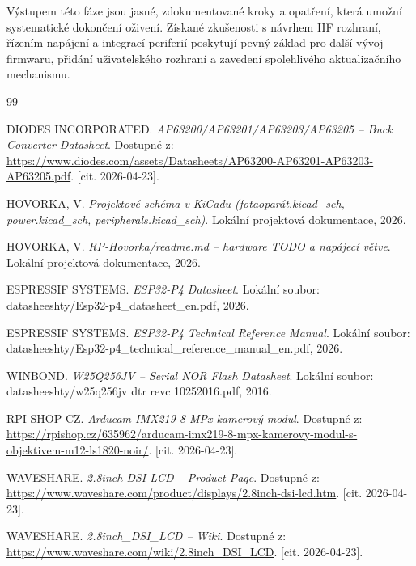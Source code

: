 \documentclass[12pt, a4paper, oneside]{report}
\begin{document}
    Výstupem této fáze jsou jasné, zdokumentované kroky a opatření, která umožní systematické dokončení oživení. Získané zkušenosti s návrhem HF rozhraní, řízením napájení a integrací periferií poskytují pevný základ pro další vývoj firmwaru, přidání uživatelského rozhraní a zavedení spolehlivého aktualizačního mechanismu.
\begin{thebibliography}{99}


 DIODES INCORPORATED. \textit{AP63200/AP63201/AP63203/AP63205 -- Buck Converter Datasheet}. Dostupné z: \url{https://www.diodes.com/assets/Datasheets/AP63200-AP63201-AP63203-AP63205.pdf}. [cit. 2026-04-23].

 HOVORKA, V. \textit{Projektové schéma v KiCadu (fotaoparát.kicad\_sch, power.kicad\_sch, peripherals.kicad\_sch)}. Lokální projektová dokumentace, 2026.

 HOVORKA, V. \textit{RP-Hovorka/readme.md -- hardware TODO a napájecí větve}. Lokální projektová dokumentace, 2026.

 ESPRESSIF SYSTEMS. \textit{ESP32-P4 Datasheet}. Lokální soubor: datasheeshty/Esp32-p4\_datasheet\_en.pdf, 2026.

 ESPRESSIF SYSTEMS. \textit{ESP32-P4 Technical Reference Manual}. Lokální soubor: datasheeshty/Esp32-p4\_technical\_reference\_manual\_en.pdf, 2026.

 WINBOND. \textit{W25Q256JV -- Serial NOR Flash Datasheet}. Lokální soubor: datasheeshty/w25q256jv dtr revc 10252016.pdf, 2016.

 RPI SHOP CZ. \textit{Arducam IMX219 8 MPx kamerový modul}. Dostupné z: \url{https://rpishop.cz/635962/arducam-imx219-8-mpx-kamerovy-modul-s-objektivem-m12-ls1820-noir/}. [cit. 2026-04-23].

 WAVESHARE. \textit{2.8inch DSI LCD -- Product Page}. Dostupné z: \url{https://www.waveshare.com/product/displays/2.8inch-dsi-lcd.htm}. [cit. 2026-04-23].

 WAVESHARE. \textit{2.8inch\_DSI\_LCD -- Wiki}. Dostupné z: \url{https://www.waveshare.com/wiki/2.8inch_DSI_LCD}. [cit. 2026-04-23].


\end{thebibliography}
\end{document}
